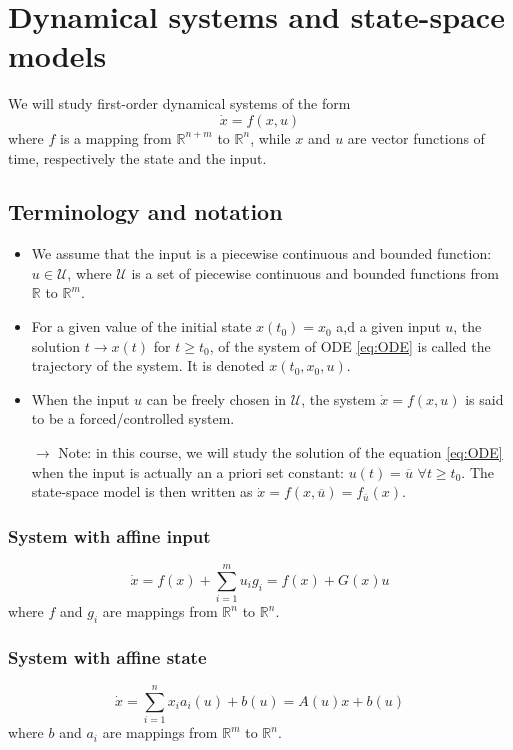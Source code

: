 \documentclass[12pt, openany]{report}
\theoremstyle{definition}
\newcommand{\R}{\mathbb{R}}
\begin{document}
\chapter{Dynamical systems and state-space models}
We will study first-order dynamical systems of the form 
\begin{equation}\label{eq:ODE}
    \dot x = f(x,u)
\end{equation}
where \(f\) is a mapping from \(\R^{n+m}\) to \(\R^n\), while \(x\) and \(u\) are vector functions of time, respectively the state and the input. 
\section{Terminology and notation}
\begin{itemize}
    \item We assume that the input is a piecewise continuous and bounded function: \(u\in \mathcal{U}\), where \(\mathcal{U}\) is a set of piecewise continuous and bounded functions from \(\R\) to \(\R^m\).
    \item For a given value of the initial state \(x(t_0)=x_0\) a,d a given input \(u\), the solution \(t\rightarrow x(t)\) for \(t\ge t_0\), of the system of ODE \ref{eq:ODE} is called the trajectory of the system. It is denoted \(x(t_0,x_0,u)\).
    \item When the input \(u\) can be freely chosen in \(\mathcal{U}\), the system \(\dot x = f(x,u)\) is said to be a forced/controlled system. 
    \item [\(\rightarrow\)] Note: in this course, we will study the solution of the equation \ref{eq:ODE} when the input is actually an a priori set constant: \(u(t) = \overline{u}\) \(\forall t\ge t_0\). The state-space model is then written as \(\dot x = f(x,\overline{u}) = f_{\overline{u}}(x)\).
\end{itemize}
\subsection{System with affine input}
\begin{equation}
    \dot x = f(x) + \sum_{i=1}^m u_ig_i = f(x) + G(x)u
\end{equation}
where \(f\) and \(g_i\) are mappings from \(\R^n\) to \(\R^n\). 
\subsection{System with affine state}
\begin{equation}
    \dot x = \sum_{i=1}^n x_ia_i(u) + b(u) = A(u)x+b(u)
\end{equation}
where \(b\) and \(a_i\) are mappings from \(\R^m\) to \(\R^n\). 
\end{document}
